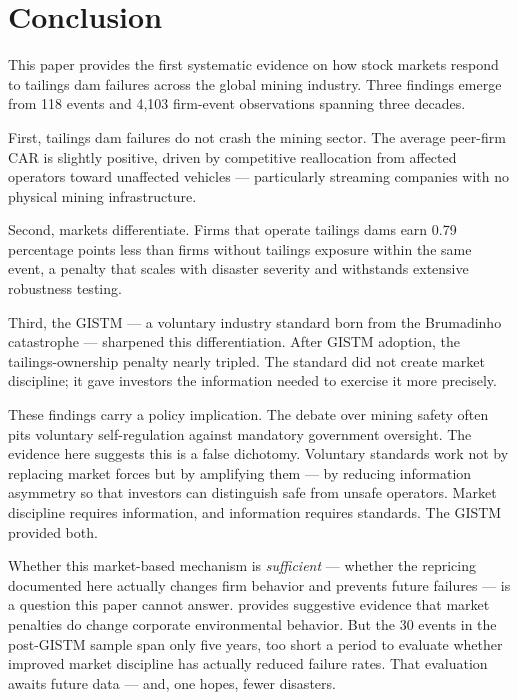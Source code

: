 \documentclass[12pt]{article}
\begin{document}
\section{Conclusion}\label{sec:conclusion}

This paper provides the first systematic evidence on how stock markets respond to tailings dam failures across the global mining industry. Three findings emerge from 118 events and 4,103 firm-event observations spanning three decades.

First, tailings dam failures do not crash the mining sector. The average peer-firm CAR is slightly positive, driven by competitive reallocation from affected operators toward unaffected vehicles --- particularly streaming companies with no physical mining infrastructure.

Second, markets differentiate. Firms that operate tailings dams earn 0.79 percentage points less than firms without tailings exposure within the same event, a penalty that scales with disaster severity and withstands extensive robustness testing.

Third, the GISTM --- a voluntary industry standard born from the Brumadinho catastrophe --- sharpened this differentiation. After GISTM adoption, the tailings-ownership penalty nearly tripled. The standard did not create market discipline; it gave investors the information needed to exercise it more precisely.

These findings carry a policy implication. The debate over mining safety often pits voluntary self-regulation against mandatory government oversight. The evidence here suggests this is a false dichotomy. Voluntary standards work not by replacing market forces but by amplifying them --- by reducing information asymmetry so that investors can distinguish safe from unsafe operators. Market discipline requires information, and information requires standards. The GISTM provided both.

Whether this market-based mechanism is \emph{sufficient} --- whether the repricing documented here actually changes firm behavior and prevents future failures --- is a question this paper cannot answer. \citet{flammer2015does} provides suggestive evidence that market penalties do change corporate environmental behavior. But the 30 events in the post-GISTM sample span only five years, too short a period to evaluate whether improved market discipline has actually reduced failure rates. That evaluation awaits future data --- and, one hopes, fewer disasters.
\end{document}
